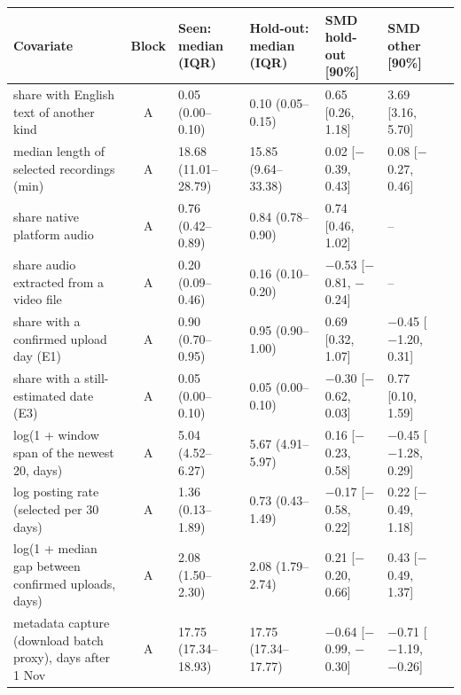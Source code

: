 {\scriptsize\setlength{\tabcolsep}{2pt}
\begin{tabular}{@{}p{}clllll@{}}
\toprule
Covariate & Block & Seen: median (IQR) & Hold-out: median (IQR) & SMD hold-out [90\%] & SMD other [90\%] \\
\midrule
share with English text of another kind & A & 0.05 (0.00--0.10) & 0.10 (0.05--0.15) & 0.65 [0.26, 1.18] & 3.69 [3.16, 5.70] \\
median length of selected recordings (min) & A & 18.68 (11.01--28.79) & 15.85 (9.64--33.38) & 0.02 [\ensuremath{-}0.39, 0.43] & 0.08 [\ensuremath{-}0.27, 0.46] \\
share native platform audio & A & 0.76 (0.42--0.89) & 0.84 (0.78--0.90) & 0.74 [0.46, 1.02] & -- \\
share audio extracted from a video file & A & 0.20 (0.09--0.46) & 0.16 (0.10--0.20) & \ensuremath{-}0.53 [\ensuremath{-}0.81, \ensuremath{-}0.24] & -- \\
share with a confirmed upload day (E1) & A & 0.90 (0.70--0.95) & 0.95 (0.90--1.00) & 0.69 [0.32, 1.07] & \ensuremath{-}0.45 [\ensuremath{-}1.20, 0.31] \\
share with a still-estimated date (E3) & A & 0.05 (0.00--0.10) & 0.05 (0.00--0.10) & \ensuremath{-}0.30 [\ensuremath{-}0.62, 0.03] & 0.77 [0.10, 1.59] \\
log(1 + window span of the newest 20, days) & A & 5.04 (4.52--6.27) & 5.67 (4.91--5.97) & 0.16 [\ensuremath{-}0.23, 0.58] & \ensuremath{-}0.45 [\ensuremath{-}1.28, 0.29] \\
log posting rate (selected per 30 days) & A & 1.36 (0.13--1.89) & 0.73 (0.43--1.49) & \ensuremath{-}0.17 [\ensuremath{-}0.58, 0.22] & 0.22 [\ensuremath{-}0.49, 1.18] \\
log(1 + median gap between confirmed uploads, days) & A & 2.08 (1.50--2.30) & 2.08 (1.79--2.74) & 0.21 [\ensuremath{-}0.20, 0.66] & 0.43 [\ensuremath{-}0.49, 1.37] \\
metadata capture (download batch proxy), days after 1 Nov & A & 17.75 (17.34--18.93) & 17.75 (17.34--17.77) & \ensuremath{-}0.64 [\ensuremath{-}0.99, \ensuremath{-}0.30] & \ensuremath{-}0.71 [\ensuremath{-}1.19, \ensuremath{-}0.26] \\

\end{tabular}}
